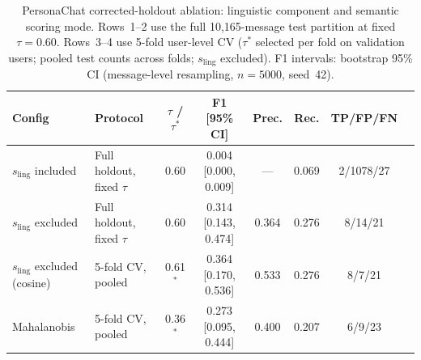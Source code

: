 

\begin{table}[t]
\centering
\caption{PersonaChat corrected-holdout ablation: linguistic component and semantic scoring mode.
Rows~1--2 use the full 10{,}165-message test partition at fixed $\tau{=}0.60$.
Rows~3--4 use 5-fold user-level CV ($\tau^*$ selected per fold on validation users;
pooled test counts across folds; $s_{\text{ling}}$ excluded).
F1 intervals: bootstrap 95\% CI (message-level resampling, $n{=}5000$, seed~42).}
\label{tab:personachat-ablation}
\small
\begin{tabular}{llcccccc}
\toprule
Config & Protocol & $\tau$ / $\tau^*$ & F1 [95\% CI] & Prec. & Rec. & TP/FP/FN \\
\midrule
$s_{\text{ling}}$ included
  & Full holdout, fixed $\tau$
  & 0.60
  & 0.004 [0.000, 0.009]
  & ---
  & 0.069
  & 2/1078/27 \\
$s_{\text{ling}}$ excluded
  & Full holdout, fixed $\tau$
  & 0.60
  & 0.314 [0.143, 0.474]
  & 0.364
  & 0.276
  & 8/14/21 \\
$s_{\text{ling}}$ excluded (cosine)
  & 5-fold CV, pooled
  & 0.61$^*$
  & 0.364 [0.170, 0.536]
  & 0.533
  & 0.276
  & 8/7/21 \\
Mahalanobis
  & 5-fold CV, pooled
  & 0.36$^*$
  & 0.273 [0.095, 0.444]
  & 0.400
  & 0.207
  & 6/9/23 \\
\bottomrule
\end{tabular}
\end{table}



